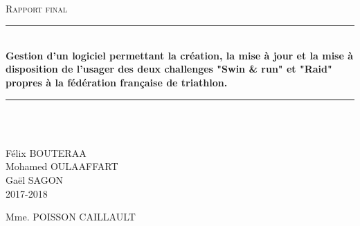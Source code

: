 \documentclass[12pt,a4paper]{report}
\newcommand{\HRule}{\rule{\linewidth}{0.5mm}}
\begin{document}
	
\begin{titlepage}
	\begin{sffamily}
		\begin{center}
			\begin{figure}
				
			\end{figure}
			
			\\[1cm]
			
			\textsc{\Large Rapport final}\\[1.5cm]
			
			\HRule \\[0.4cm]
			{ \huge \bfseries Gestion d'un logiciel permettant la création, la mise à jour et la mise à disposition de l'usager des deux challenges "Swin \& run" et "Raid" propres à la fédération française de triathlon. \\[0.4cm] }
			\HRule \\[1.5cm]
			
			\\[5cm]
			
			
			\begin{flushleft}
				Félix BOUTERAA \\
				Mohamed OULAAFFART \\
				Gaël SAGON \\
				2017-2018 \\
			\end{flushleft}  
			
			\begin{flushright}
				Mme. POISSON CAILLAULT
			\end{flushright}  
			
		\end{center}
	\end{sffamily}
\end{titlepage}

	
	\newpage
	
\end{document}
